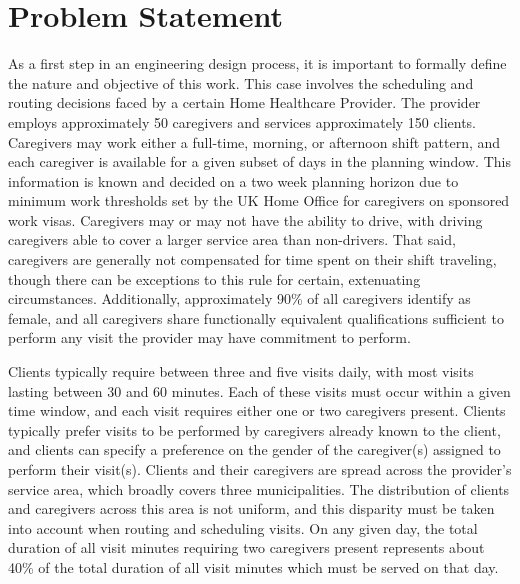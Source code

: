 \documentclass[11pt,twoside]{article}
\numberwithin{Theorem}{section}
\numberwithin{Definition}{section}
\numberwithin{Lemma}{section}
\numberwithin{Algorithm}{section}
\numberwithin{equation}{section}
\begin{document}
\clearpage

\section{Problem Statement}
\label{sec:prob}
As a first step in an engineering design process, it is important to formally define the nature and objective of this work. This case involves the scheduling and routing decisions faced by a certain Home Healthcare Provider. The provider employs approximately 50 caregivers and services approximately 150 clients. Caregivers may work either a full-time, morning, or afternoon shift pattern, and each caregiver is available for a given subset of days in the planning window. This information is known and decided on a two week planning horizon due to minimum work thresholds set by the UK Home Office for caregivers on sponsored work visas. Caregivers may or may not have the ability to drive, with driving caregivers able to cover a larger service area than non-drivers. That said, caregivers are generally not compensated for time spent on their shift traveling, though there can be exceptions to this rule for certain, extenuating circumstances. Additionally, approximately 90\% of all caregivers identify as female, and all caregivers share functionally equivalent qualifications sufficient to perform any visit the provider may have commitment to perform. 

Clients typically require between three and five visits daily, with most visits lasting between 30 and 60 minutes. Each of these visits must occur within a given time window, and each visit requires either one or two caregivers present. Clients typically prefer visits to be performed by caregivers already known to the client, and clients can specify a preference on the gender of the caregiver(s) assigned to perform their visit(s). Clients and their caregivers are spread across the provider's service area, which broadly covers three municipalities. The distribution of clients and caregivers across this area is not uniform, and this disparity must be taken into account when routing and scheduling visits. On any given day, the total duration of all visit minutes requiring two caregivers present represents about 40\% of the total duration of all visit minutes which must be served on that day. 
\end{document}
